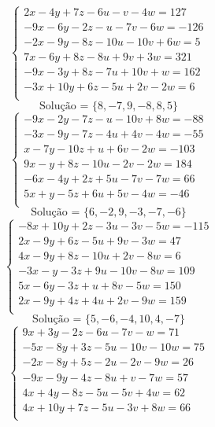 \documentclass[12pt,oneside,a4paper]{article}
\begin{document}
\vspace{\baselineskip}
\begin{equation*}
\begin{cases}
2x-4y+7z-6u-v-4w=127 \\
-9x-6y-2z-u-7v-6w=-126 \\
-2x-9y-8z-10u-10v+6w=5 \\
7x-6y+8z-8u+9v+3w=321 \\
-9x-3y+8z-7u+10v+w=162 \\
-3x+10y+6z-5u+2v-2w=6 \\
\end{cases}
\end{equation*}
\begin{equation*}
\text{Solução = }\{8,-7,9,-8,8,5\}
\end{equation*}
\vspace{\baselineskip}
\begin{equation*}
\begin{cases}
-9x-2y-7z-u-10v+8w=-88 \\
-3x-9y-7z-4u+4v-4w=-55 \\
x-7y-10z+u+6v-2w=-103 \\
9x-y+8z-10u-2v-2w=184 \\
-6x-4y+2z+5u-7v-7w=66 \\
5x+y-5z+6u+5v-4w=-46 \\
\end{cases}
\end{equation*}
\begin{equation*}
\text{Solução = }\{6,-2,9,-3,-7,-6\}
\end{equation*}
\vspace{\baselineskip}
\begin{equation*}
\begin{cases}
-8x+10y+2z-3u-3v-5w=-115 \\
2x-9y+6z-5u+9v-3w=47 \\
4x-9y+8z-10u+2v-8w=6 \\
-3x-y-3z+9u-10v-8w=109 \\
5x-6y-3z+u+8v-5w=150 \\
2x-9y+4z+4u+2v-9w=159 \\
\end{cases}
\end{equation*}
\begin{equation*}
\text{Solução = }\{5,-6,-4,10,4,-7\}
\end{equation*}
\vspace{\baselineskip}
\begin{equation*}
\begin{cases}
9x+3y-2z-6u-7v-w=71 \\
-5x-8y+3z-5u-10v-10w=75 \\
-2x-8y+5z-2u-2v-9w=26 \\
-9x-9y-4z-8u+v-7w=57 \\
4x+4y-8z-5u-5v+4w=62 \\
4x+10y+7z-5u-3v+8w=66 \\
\end{cases}
\end{equation*}
\end{document}

